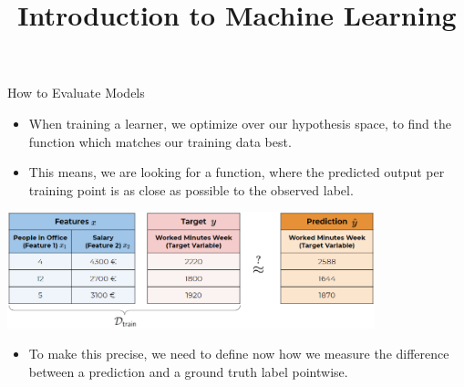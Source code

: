 \documentclass[11pt,compress,t,notes=noshow, xcolor=table]{beamer}
\title{Introduction to Machine Learning}
\institute{\href{https://compstat-lmu.github.io/lecture_i2ml/}{compstat-lmu.github.io/lecture\_i2ml}}
\date{}
\begin{document}

\begin{vbframe}{How to Evaluate Models}

\begin{itemize}
\item When training a learner, we optimize over our hypothesis space,
    to find the function which matches our training data best.
\item This means, we are looking for a function, where the 
    predicted output per training point is as close as possible to
    the observed label.
\end{itemize}





\begin{center}\includegraphics[width=0.8\textwidth]{figure_man/ml-basics-riskmin-eval.png} \end{center}
\begin{itemize}
    \item To make this precise, we need to define now how we measure the difference
        between a prediction and a ground truth label pointwise.
  \end{itemize}
  
\end{vbframe}
\end{document}
